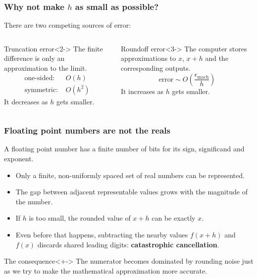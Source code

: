 \documentclass[]{article}
\begin{document}
\begin{frame}
	\frametitle{Why not make $h$ as small as possible?}

	There are two competing sources of error:
	\begin{columns}
		\begin{block}{Truncation error}<2->
			The finite difference is only an approximation to the limit.
			\begin{align*}
				\text{one-sided: } & O(h) \\
				\text{symmetric: } & O(h^2)
			\end{align*}
			It decreases as $h$ gets smaller.
		\end{block}

		\begin{block}{Roundoff error}<3->
			The computer stores approximations to $x$, $x+h$ and the corresponding outputs.
			\begin{equation*}
				\text{error} \sim O\!\left(\frac{\epsilon_{\mathrm{mach}}}{h}\right)
			\end{equation*}
			It increases as $h$ gets smaller.
		\end{block}
	\end{columns}

\end{frame}


\begin{frame}
	\frametitle{Floating point numbers are not the reals}

	A floating point number has a finite number of bits for its sign, significand and exponent.

	\begin{itemize}
		\item Only a finite, non-uniformly spaced set of real numbers can be represented.
		\item The gap between adjacent representable values grows with the magnitude of the number.
		\item If $h$ is too small, the rounded value of $x+h$ can be exactly $x$.
		\item Even before that happens, subtracting the nearby values $f(x+h)$ and $f(x)$ discards shared leading digits: \textbf{catastrophic cancellation}.
	\end{itemize}

	\begin{block}{The consequence}<+->
		The numerator becomes dominated by rounding noise just as we try to make the mathematical approximation more accurate.
	\end{block}
\end{frame}
\end{document}
